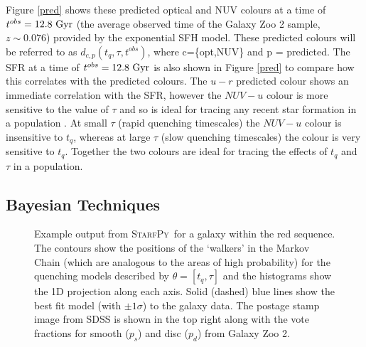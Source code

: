 \documentclass[useAMS,usenatbib]{mn2e}
\def\changed    {\color{titlecol} }
\def\starfpy {\textsc{StarfPy}}
\begin{document}
Figure \ref{pred} shows these predicted optical and NUV colours at a time of $t^{obs} = 12.8 ~\rm{Gyr}$ (the average observed time of the Galaxy Zoo 2 sample, $z \sim 0.076$) provided by the exponential SFH model. These predicted colours will be referred to as $d_{c,p}(t_{q}, \tau, t^{obs})$, where c=\{opt,NUV\} and p = predicted. The SFR at a time of $t^{obs}=12.8~\rm{Gyr}$ is also shown in Figure \ref{pred} to compare how this correlates with the predicted colours. The $u-r$ predicted colour shows an immediate correlation with the SFR, however the $NUV-u$ colour is more sensitive to the value of $\tau$ and so is ideal for tracing any recent star formation in a population . At small $\tau$ (rapid quenching timescales) the $NUV-u$ colour is insensitive to $t_{q}$, whereas at large $\tau$ (slow quenching timescales) the colour is very sensitive to $t_{q}$. Together the two colours are ideal for tracing the effects of $t_{q}$ and $\tau$ in a population. 




\subsection{Bayesian Techniques}\label{stats}

\begin{figure}
\caption{{\changed Example output from \starfpy ~for a galaxy within the red sequence. The contours show the positions of the `walkers' in the Markov Chain (which are analogous to the areas of high probability) for the quenching models described by $\theta = [t_q, \tau]$ and the histograms show the 1D projection along each axis. Solid (dashed) blue lines show the best fit model (with $\pm 1\sigma$) to the galaxy data. The postage stamp image from SDSS is shown in the top right along with the vote fractions for smooth ($p_s$) and disc ($p_d$) from Galaxy Zoo 2.} }
\label{one_example}
\end{figure}
\end{document}
